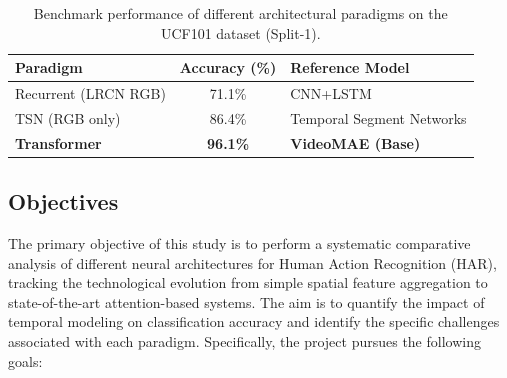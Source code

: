 \begin{table}[h]
\centering
\begin{tabular}{lcl}
\toprule
\textbf{Paradigm} & \textbf{Accuracy (\%)} & \textbf{Reference Model} \\
\midrule
Recurrent (LRCN RGB) & 71.1\% & CNN+LSTM \cite{Donahue2015} \\
TSN (RGB only) & 86.4\% & Temporal Segment Networks \cite{Wang2016} \\
\textbf{Transformer} & \textbf{96.1\%} & \textbf{VideoMAE (Base)} \cite{Tong2022} \\
\bottomrule
\end{tabular}
\caption{Benchmark performance of different architectural paradigms on the UCF101 dataset (Split-1).}
\label{tab:sota_benchmarks}
\end{table}


\subsection{Objectives}

The primary objective of this study is to perform a systematic comparative analysis of different neural architectures for Human Action Recognition (HAR), tracking the technological evolution from simple spatial feature aggregation to state-of-the-art attention-based systems. The aim is to quantify the impact of temporal modeling on classification accuracy and identify the specific challenges associated with each paradigm. Specifically, the project pursues the following goals:

